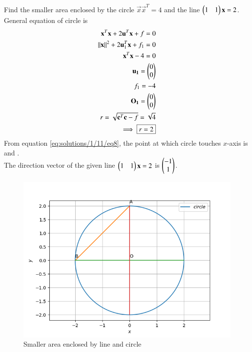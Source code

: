 
Find the smaller area enclosed by the circle  $\vec{x}\vec{x}^T=4$ and the line $\begin{pmatrix}1 & 1\end{pmatrix} \mathbf{x}=2$.
General equation of circle is 
\begin{align}
{\mathbf{x}^T\mathbf{x}} + 2\mathbf{u}^T\mathbf{x} + f = 0 \label{eq:solutions/1/11/eq1}\\
 \left\lVert\mathbf{x}\right\rVert^2 + 2\mathbf{u}_1^T\mathbf{x} + f_1 = 0\label{eq:solutions/1/11/eq2}\\
 {\mathbf{x}^{T}\mathbf{x}}-4=0 \label{eq:solutions/1/11/eq3}\\
 \mathbf{u_1}=\begin{pmatrix}0\\0\end{pmatrix}\label{eq:solutions/1/11/eq4}\\
 f_1=-4\label{eq:solutions/1/11/eq5}\\
\mathbf{O_1}=\begin{pmatrix}0\\0\end{pmatrix}\label{eq:solutions/1/11/eq6}\\
r=\sqrt{\mathbf{c}^{T}\mathbf{c}-f} = \sqrt{4}\label{eq:solutions/1/11/eq7}\\
    \implies \boxed{r=2} \label{eq:solutions/1/11/eq8}
 \end{align}
From equation \eqref{eq:solutions/1/11/eq8}, the point at which circle touches $x$-axis is  and .\\
The direction vector of the given line $\begin{pmatrix}1&1\end{pmatrix}\mathbf{x}=2$ is $\begin{pmatrix}-1\\1\end{pmatrix}$.\\

\begin{figure}[!ht]
	\centering
	\includegraphics[width=\columnwidth]{./solutions/conics/1/11/circle.png}
	\caption{Smaller area enclosed by line and circle}
	\label{eq:solutions/1/11/eq:myfig}
\end{figure}

